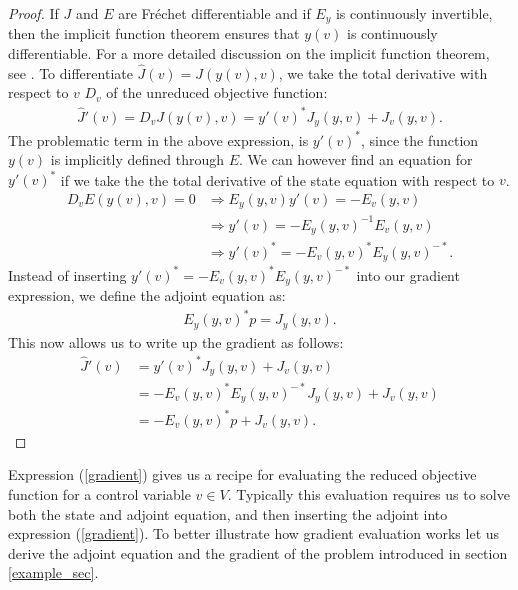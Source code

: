 \begin{proof}
If $J$ and $E$ are  Fr\'{e}chet differentiable and if $E_y$ is continuously invertible, then the implicit function theorem ensures that $y(v)$ is continuously differentiable. For a more detailed discussion on the implicit function theorem, see \cite{hinze2008optimization}. To differentiate $\hat J(v) = J(y(v),v)$, we take the total derivative with respect to $v$ $D_v$ of the unreduced objective function:
\begin{align*}
\hat J'(v)=D_vJ(y(v),v) = y'(v)^*J_y(y,v) + J_v(y,v).
\end{align*}
The problematic term in the above expression, is $y'(v)^*$, since the function $y(v)$ is implicitly defined through $E$. We can however find an equation for $y'(v)^*$ if we take the the total derivative of the state equation with respect to $v$.
\begin{align*}
D_vE(y(v),v)=0 &\Rightarrow E_y(y,v)y'(v)=-E_v(y,v) \\ 
&\Rightarrow y'(v)=-E_y(y,v)^{-1}E_v(y,v) \\ 
&\Rightarrow y'(v)^* = -E_v(y,v)^*E_y(y,v)^{-*}.
\end{align*}
Instead of inserting $y'(v)^* = -E_v(y,v)^*E_y(y,v)^{-*}$ into our gradient expression, we define the adjoint equation as:
\begin{align*}
E_y(y,v)^{*}p=J_y(y,v). 
\end{align*}
This now allows us to write up the gradient as follows:
\begin{align*}
\hat{J}'(v)&= y'(v)^*J_y(y,v) + J_v(y,v)\\
&=-E_v(y,v)^*E_y(y,v)^{-*}J_y(y,v) + J_v(y,v) \\
&= -E_v(y,v)^*p +J_v(y,v). 
\end{align*}
\end{proof}
\noindent
Expression (\ref{gradient}) gives us a recipe for evaluating the reduced objective function for a control variable $v\in V$. Typically this evaluation requires us to solve both the state and adjoint equation, and then inserting the adjoint into expression (\ref{gradient}). To better illustrate how gradient evaluation works let us derive the adjoint equation and the gradient of the problem introduced in section \ref{example_sec}.
